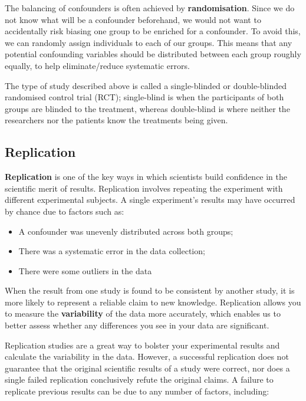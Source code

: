 \documentclass[10pt,a4paper,twoside]{article}\usepackage[]{graphicx}\usepackage[]{xcolor}
\begin{document}
The balancing of confounders is often achieved by \textbf{randomisation}. Since we do not know what will be a confounder beforehand, we would not want to accidentally risk biasing one group to be enriched for a confounder. To avoid this, we can randomly assign individuals to each of our groups. This means that any potential confounding variables should be distributed between each group roughly equally, to help eliminate/reduce systematic errors.

The type of study described above is called a single-blinded or double-blinded randomised control trial (RCT); single-blind is when the participants of both groups are blinded to the treatment, whereas double-blind is where neither the researchers nor the patients know the treatments being given.

\subsection{Replication}

\textbf{Replication} is one of the key ways in which scientists build confidence in the scientific merit of results. Replication involves repeating the experiment with different experimental subjects. A single experiment's results may have occurred by chance due to factors such as:

\begin{itemize}
  \item A confounder was unevenly distributed across both groups;
  \item There was a systematic error in the data collection;
  \item There were some outliers in the data
\end{itemize}

When the result from one study is found to be consistent by another study, it is more likely to represent a reliable claim to new knowledge. Replication allows you to measure the \textbf{variability} of the data more accurately, which enables us to better assess whether any differences you see in your data are significant.

Replication studies are a great way to bolster your experimental results and calculate the variability in the data. However, a successful replication does not guarantee that the original scientific results of a study were correct, nor does a single failed replication conclusively refute the original claims. A failure to replicate previous results can be due to any number of factors, including:
\end{document}
